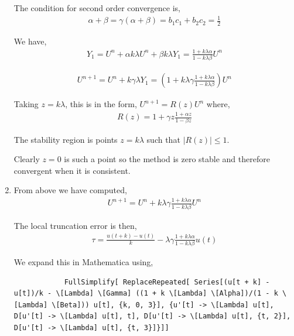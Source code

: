 \documentclass[10pt]{article}
\begin{document}
\begin{solution}[Solution]
\begin{enumerate}[label=(\alph*)]
        The condition for second order convergence is,
        \begin{align*}
            \alpha + \beta = \gamma(\alpha+\beta) = b_1c_1 + b_2c_2 = \frac{1}{2}
        \end{align*}
 
        \hrulefill

        We have,
        \begin{align*}
            Y_1 = U^n + \alpha k \lambda U^n + \beta k \lambda Y_1 = \frac{1+k \lambda  \alpha}{1- k \lambda \beta }U^n
        \end{align*}
        
        \begin{align*}
            U^{n+1} = U^n + k \gamma \lambda Y_1 = \left( 1 + k \lambda \gamma \frac{1+ k \lambda \alpha}{1 - k \lambda \beta} \right) U^n
        \end{align*}

        Taking \( z = k \lambda \), this is in the form, \( U^{n+1} = R(z)U^n \) where,
        \begin{align*}
            R(z) = 1 + \gamma z \frac{1+\alpha z}{ 1- \beta z}
        \end{align*}

        The stability region is points \( z = k \lambda \) such that \( |R(z)| \leq 1 \).

        Clearly \( z=0 \) is such a point so the method is zero stable and therefore convergent when it is consistent.
        
    \item

        From above we have computed,
        \begin{align*}
            U^{n+1} = U^n + k \lambda \gamma \frac{1+k \lambda \alpha}{1 - k \lambda \beta}U^n
        \end{align*}

        The local truncation error is then,
        \begin{align*}
            \tau = \frac{u(t+k) - u(t)}{k} - \lambda \gamma \frac{1+k \lambda \alpha}{1-k \lambda \beta}u(t)
        \end{align*}
         
        We expand this in Mathematica using,
        \begin{lstlisting}
            FullSimplify[ ReplaceRepeated[ Series[(u[t + k] - u[t])/k - \[Lambda] \[Gamma] ((1 + k \[Lambda] \[Alpha])/(1 - k \[Lambda] \[Beta])) u[t], {k, 0, 3}], {u'[t] -> \[Lambda] u[t], D[u'[t] -> \[Lambda] u[t], t], D[u'[t] -> \[Lambda] u[t], {t, 2}], D[u'[t] -> \[Lambda] u[t], {t, 3}]}]]
        \end{lstlisting}
        

\end{enumerate}
\end{solution}
\end{document}
